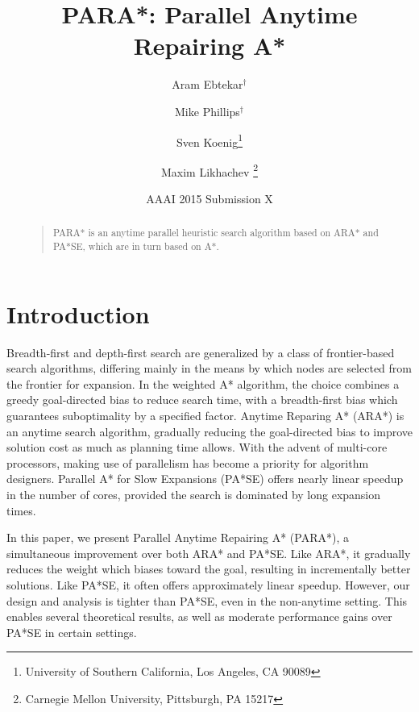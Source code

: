\documentclass[letterpaper]{article}
\begin{document}
%
\title{PARA*: Parallel Anytime Repairing A*}
\author{Aram Ebtekar$^\dagger$ \and Mike Phillips$^\dagger$ \and Sven Koenig\thanks{University of Southern California, Los Angeles, CA 90089} \and Maxim Likhachev%
\thanks{Carnegie Mellon University, Pittsburgh, PA 15217}%
%
}
\author{AAAI 2015 Submission X}%
\maketitle
\begin{abstract}
\begin{quote}
PARA* is an anytime parallel heuristic search algorithm based on ARA* and PA*SE, which are in turn based on A*.
\end{quote}
\end{abstract}

\section{Introduction}

Breadth-first and depth-first search are generalized by a class of frontier-based search algorithms, differing mainly in the means by which nodes are selected from the frontier for expansion. In the weighted A* algorithm, the choice combines a greedy goal-directed bias to reduce search time, with a breadth-first bias which guarantees suboptimality by a specified factor. Anytime Reparing A* (ARA*) is an anytime search algorithm, gradually reducing the goal-directed bias to improve solution cost as much as planning time allows. With the advent of multi-core processors, making use of parallelism has become a priority for algorithm designers. Parallel A* for Slow Expansions (PA*SE) offers nearly linear speedup in the number of cores, provided the search is dominated by long expansion times.

In this paper, we present Parallel Anytime Repairing A* (PARA*), a simultaneous improvement over both ARA* and PA*SE. Like ARA*, it gradually reduces the weight which biases toward the goal, resulting in incrementally better solutions. Like PA*SE, it often offers approximately linear speedup. However, our design and analysis is tighter than PA*SE, even in the non-anytime setting. This enables several theoretical results, as well as moderate performance gains over PA*SE in certain settings.
\end{document}

